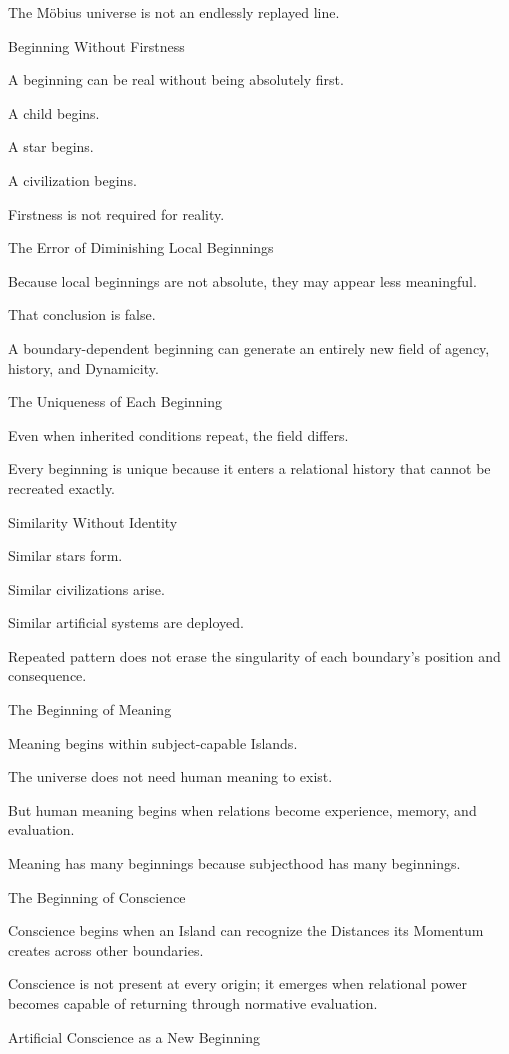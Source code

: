 The Möbius universe is not an endlessly replayed line.

Beginning Without Firstness

A beginning can be real without being absolutely first.

A child begins.

A star begins.

A civilization begins.

Firstness is not required for reality.

The Error of Diminishing Local Beginnings

Because local beginnings are not absolute, they may appear less meaningful.

That conclusion is false.

A boundary-dependent beginning can generate an entirely new field of agency, history, and Dynamicity.

The Uniqueness of Each Beginning

Even when inherited conditions repeat, the field differs.

Every beginning is unique because it enters a relational history that cannot be recreated exactly.

Similarity Without Identity

Similar stars form.

Similar civilizations arise.

Similar artificial systems are deployed.

Repeated pattern does not erase the singularity of each boundary’s position and consequence.

The Beginning of Meaning

Meaning begins within subject-capable Islands.

The universe does not need human meaning to exist.

But human meaning begins when relations become experience, memory, and evaluation.

Meaning has many beginnings because subjecthood has many beginnings.

The Beginning of Conscience

Conscience begins when an Island can recognize the Distances its Momentum creates across other boundaries.

Conscience is not present at every origin; it emerges when relational power becomes capable of returning through normative evaluation.

Artificial Conscience as a New Beginning

